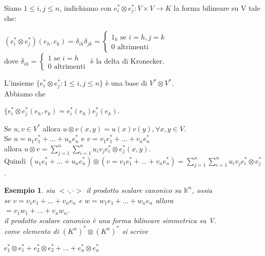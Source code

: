 \documentclass[a4paper,12pt]{article}
\theoremstyle{def}
\theoremstyle{prop}
\theoremstyle{esempio}
\newtheorem*{example}{Esempio}
\theoremstyle{dimostrazione}
\theoremstyle{teo}
\theoremstyle{osservazione}
\begin{document}
Siano \(1 \leq i,j \leq n\), indichiamo con \(e_i^* \otimes e_j^* : V \times V \rightarrow K\) la forma bilineare su V tale che:
\begin{center}
	\((e_i^* \otimes e_j^*)(e_h, e_k) = \delta_{ih} \delta_{jk} = \begin{cases}
		1_k \text{ se } i = h, j = k \\
		0 \text{ altrimenti}
	\end{cases}\)\\
	dove \(\delta_{ih} = \begin{cases}
		1 \text{ se } i = h \\
		0 \text{ altrimenti}
	\end{cases}\) è la delta di Kronecker.
\end{center}
L'insieme \(\{e_i^* \otimes e_j^* : 1 \leq i,j \leq n\}\) è una base di \(V^* \otimes V^*\).\\
Abbiamo che 
\begin{center}
	\(\{e_i^* \otimes e_j^* (e_h, e_k) = e_i^*(e_h)e_j^*(e_k)\).\\
\end{center}
Se \(u, v \in V^*\) allora \(u \otimes v (x, y) = u(x) v(y), \forall x,y \in V \).\\
Se \(u = u_1e_1^* + ... + u_n e_n^*\) e \(v = v_1 e_1^* + ... + v_n e_n^*\)\\
allora \(u \otimes v = \sum_{j = 1}^{n} \sum_{i = 1}^{n} u_i v_j e_i^* \otimes e_j^*(x,y)\).\\
Quindi \((u_1e_1^* + ... + u_n e_n^*) \otimes (v = v_1 e_1^* + ... + v_n e_n^*) = \sum_{j = 1}^{n} \sum_{i = 1}^{n} u_i v_j e_i^* \otimes e_j^*\).\\

\begin{example}
	sia \(<\cdot, \cdot>\) il prodotto scalare canonico su \(\mathbb{K}^n\), ossia\\
	se \(v = v_1 e_1 + ... + v_n e_n\) e \(w = w_1 e_1 + ... + w_n e_n\) allora\\
	\(< v, w >= v_1 w_1 + ... + v_n w_n\).\\
	il prodotto scalare canonico è una forma bilineare simmetrica su V.\\
	come elemento di \((K^n)^* \otimes (K^n)^*\) si scrive
	\begin{center}
		\(e_1^* \otimes e_1^* + e_2^* \otimes e_2^* + ... + e_n^* \otimes e_n^*\)
	\end{center}
\end{example}
\end{document}
